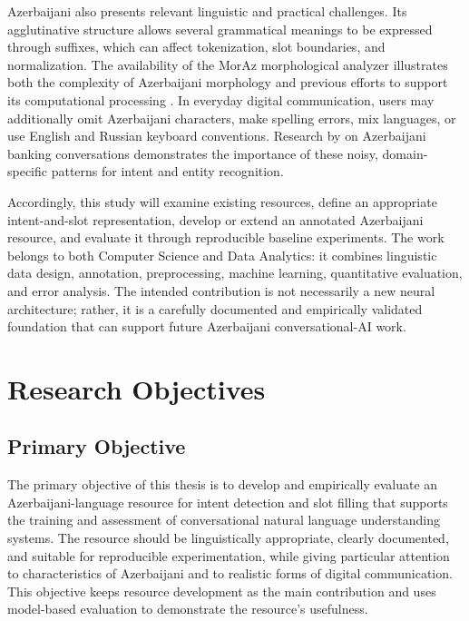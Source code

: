 \documentclass[12pt,a4paper]{article}
\begin{document}
Azerbaijani also presents relevant linguistic and practical challenges. Its agglutinative structure allows several grammatical meanings to be expressed through suffixes, which can affect tokenization, slot boundaries, and normalization. The availability of the MorAz morphological analyzer illustrates both the complexity of Azerbaijani morphology and previous efforts to support its computational processing \citep{ozenc2018moraz}. In everyday digital communication, users may additionally omit Azerbaijani characters, make spelling errors, mix languages, or use English and Russian keyboard conventions. Research by \citet{rustamov2021dialogue} on Azerbaijani banking conversations demonstrates the importance of these noisy, domain-specific patterns for intent and entity recognition.

Accordingly, this study will examine existing resources, define an appropriate intent-and-slot representation, develop or extend an annotated Azerbaijani resource, and evaluate it through reproducible baseline experiments. The work belongs to both Computer Science and Data Analytics: it combines linguistic data design, annotation, preprocessing, machine learning, quantitative evaluation, and error analysis. The intended contribution is not necessarily a new neural architecture; rather, it is a carefully documented and empirically validated foundation that can support future Azerbaijani conversational-AI work.

\enlargethispage{\baselineskip}

\section{Research Objectives}

\subsection{Primary Objective}

The primary objective of this thesis is to develop and empirically evaluate an Azerbaijani-language resource for intent detection and slot filling that supports the training and assessment of conversational natural language understanding systems. The resource should be linguistically appropriate, clearly documented, and suitable for reproducible experimentation, while giving particular attention to characteristics of Azerbaijani and to realistic forms of digital communication. This objective keeps resource development as the main contribution and uses model-based evaluation to demonstrate the resource's usefulness.
\end{document}
